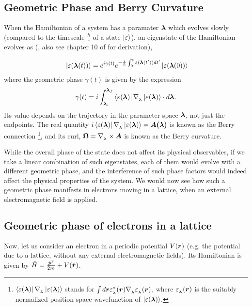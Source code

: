 \documentclass{report}
\renewcommand\vec[1]{\ensuremath\boldsymbol{#1}} %
\begin{document}
\subsection{Geometric Phase and Berry Curvature}
When the Hamiltonian of a system has a paramater $\vec{\lambda}$ which evolves slowly (compared to the timescale $\frac{\hbar}{\varepsilon}$ of a state $\ket{\varepsilon}$), an eigenstate of the Hamiltonian evolves as (\cite{BerryQuantalPhase1984}, also see chapter 10 of  \cite{book:Griffiths2004IntroductiontoQM} for derivation),

\begin{equation}~\label{Eq:BerryPhaseOriginal}
	\ket{\varepsilon(\vec{\lambda}(t))} = e^{i \gamma(t)} e^{-\frac{i}{\hbar} \int_0^t \varepsilon(\vec{\lambda}(t')) dt'} \ket{\varepsilon(\vec{\lambda}(0))}
\end{equation}
where the geometric phase $\gamma(t)$ is given by the expression $$\gamma(t) = i\int_{\vec{\lambda}_i}^{\vec{\lambda}_f} \bra{\varepsilon({\vec{\lambda}})}\nabla_{_{\vec{\lambda}}} \ket{\varepsilon({\vec{\lambda}})} \cdot d \vec{\lambda}.$$ Its value depends on the trajectory in the parameter space $\vec{\lambda}$, not just the endpoints. The real quantity $i\bra{\varepsilon({\vec{\lambda}})}\nabla_{_{\vec{\lambda}}}\ket{\varepsilon({\vec{\lambda}})} = \vec{A(\vec{\lambda})}$ is known as the Berry connection  \footnote{$\bra{\varepsilon({\vec{\lambda}})}\nabla_{_{\vec{\lambda}}} \ket{\varepsilon({\vec{\lambda}})}$ stands for $\int d\vec{r} \varepsilon_{_{\vec{\lambda}}}^* (\vec{r}) \nabla_{_{\vec{\lambda}}} \varepsilon_{_{\vec{\lambda}}}(\vec{r})$, where $\varepsilon_{_{\vec{\lambda}}}(\vec{r})$ is the suitably normalized position space wavefunction of $\ket{\varepsilon({\vec{\lambda}})}$.}, and its curl, $\vec{\Omega} = \nabla_{_{\vec{\lambda}}} \times \vec{A}$ is known as the Berry curvature.

While the overall phase of the state does not affect its physical observables, if we take a linear combination of such eigenstates, each of them would evolve with a different geometric phase, and the interference of such phase factors would indeed affect the physical properties of the system. We would now see how such a geometric phase manifests in electrons moving in a lattice, when an external electromagnetic field is applied.


\subsection{Geometric phase of electrons in a lattice}
Now, let us consider an electron in a periodic potential $V(\vec{r})$ (e.g. the potential due to a lattice, without any external electromagnetic fields). Its Hamiltonian is given by $\hat{H} = \frac{{\hat{\vec{p}}}^2}{2 m} + V(\hat{\vec{r}})$.
\end{document}
